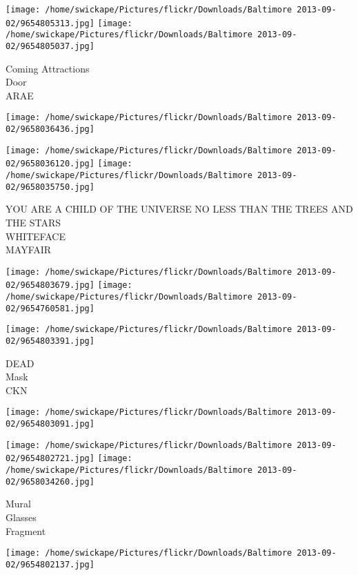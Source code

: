 \documentclass[10pt,letterpaper]{article}
\begin{document}
\vspace{0.25in}
\texttt{[image: /home/swickape/Pictures/flickr/Downloads/Baltimore 2013-09-02/9654805313.jpg]}
\texttt{[image: /home/swickape/Pictures/flickr/Downloads/Baltimore 2013-09-02/9654805037.jpg]}

Coming Attractions\\
Door\\
ARAE\\
\pagebreak

\texttt{[image: /home/swickape/Pictures/flickr/Downloads/Baltimore 2013-09-02/9658036436.jpg]}

\vspace{0.25in}
\texttt{[image: /home/swickape/Pictures/flickr/Downloads/Baltimore 2013-09-02/9658036120.jpg]}
\texttt{[image: /home/swickape/Pictures/flickr/Downloads/Baltimore 2013-09-02/9658035750.jpg]}

YOU ARE A CHILD OF THE UNIVERSE NO LESS THAN THE TREES AND THE STARS\\
WHITEFACE\\
MAYFAIR\\
\pagebreak

\texttt{[image: /home/swickape/Pictures/flickr/Downloads/Baltimore 2013-09-02/9654803679.jpg]}
\texttt{[image: /home/swickape/Pictures/flickr/Downloads/Baltimore 2013-09-02/9654760581.jpg]}

\vspace{0.25in}
\texttt{[image: /home/swickape/Pictures/flickr/Downloads/Baltimore 2013-09-02/9654803391.jpg]}

DEAD\\
Mask\\
CKN\\
\pagebreak

\texttt{[image: /home/swickape/Pictures/flickr/Downloads/Baltimore 2013-09-02/9654803091.jpg]}

\vspace{0.25in}
\texttt{[image: /home/swickape/Pictures/flickr/Downloads/Baltimore 2013-09-02/9654802721.jpg]}
\texttt{[image: /home/swickape/Pictures/flickr/Downloads/Baltimore 2013-09-02/9658034260.jpg]}

Mural\\
Glasses\\
Fragment\\
\pagebreak

\texttt{[image: /home/swickape/Pictures/flickr/Downloads/Baltimore 2013-09-02/9654802137.jpg]}
\end{document}
